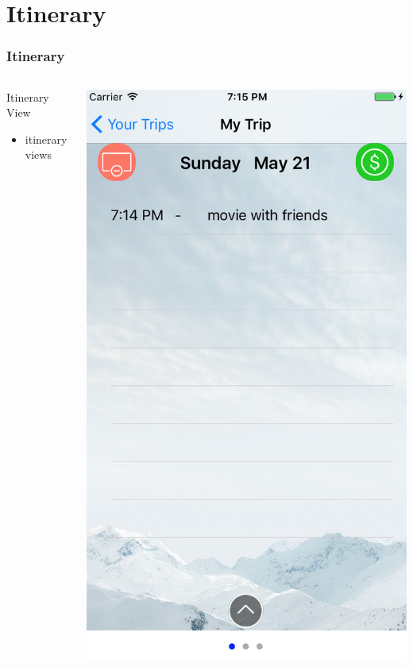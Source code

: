 \documentclass{beamer}
\begin{document}
\section{Itinerary}
\begin{frame}
\frametitle{Itinerary}
\begin{columns}
    \begin{column}{0.3\textwidth}
        Itinerary View
        \begin{itemize}
            \item itinerary views
        \end{itemize}
    \end{column}
    \begin{column}{0.3\textwidth}  %
        \begin{center}
            \includegraphics[scale=0.3]{itinerary}

\end{center}
\end{column}
\end{columns}
\end{frame}
\end{document}
